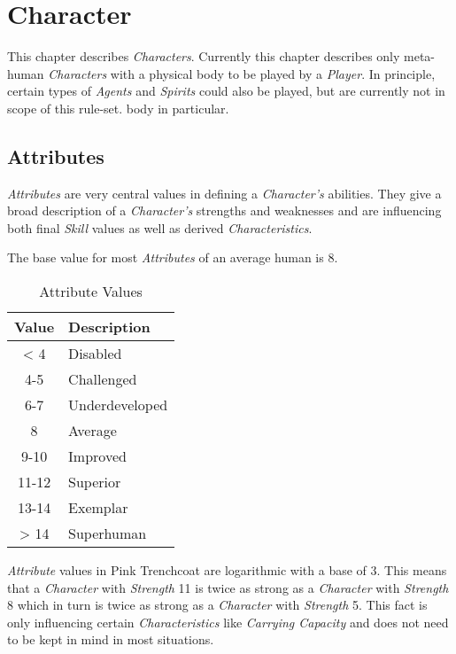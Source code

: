 \chapter{Character}

This chapter describes \emph{Characters}. Currently this chapter describes only
meta-human \emph{Characters} with a physical body to be played by a \emph{Player}.
In principle, certain types of \emph{Agents} and \emph{Spirits} could also be played,
but are currently not in scope of this rule-set.
body in particular.

\section{Attributes}

\emph{Attributes} are very central values in defining a \emph{Character's}
abilities. They give a broad description of a \emph{Character's} strengths and
weaknesses and are influencing both final \emph{Skill} values as well as derived
\emph{Characteristics}.

The base value for most \emph{Attributes} of an average human is 8.

\begin{table}[htb]
    \caption[Attribute Values]{Attribute Values}
    \label{tab:attribute values}
    \centering
    \begin{tabular}{cl}
        \toprule
        \textbf{Value} & \textbf{Description} \\
        \midrule
        < 4            & Disabled             \\
        4-5            & Challenged           \\
        6-7            & Underdeveloped       \\
        8              & Average              \\
        9-10           & Improved             \\
        11-12          & Superior             \\
        13-14          & Exemplar             \\
        > 14           & Superhuman           \\
        \bottomrule
    \end{tabular}
\end{table}

\emph{Attribute} values in Pink Trenchcoat are logarithmic with a base of 3.
This means that a \emph{Character} with \emph{Strength} 11 is twice as strong as a
\emph{Character} with \emph{Strength} 8 which in turn is twice as strong as a
\emph{Character} with \emph{Strength} 5.
This fact is only influencing certain \emph{Characteristics} like
\emph{Carrying Capacity} and does not need to be kept in mind in most situations.


